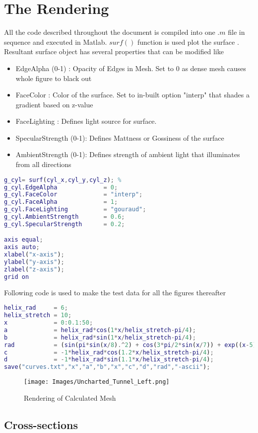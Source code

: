 \documentclass[a4paper]{article}
\begin{document}
\newpage
\hypertarget{the-rendering}{%
\section{ The Rendering}\label{the-rendering}}
All the code described throughout the document is compiled into one \(.m\) file in sequence and executed in Matlab. \(surf()\) function is used plot the surface \cite{mathworks_surf}. Resultant surface object has several properties that can be modified like \cite{mathworks_surface_properties}
\begin{itemize}
    \item EdgeAlpha (0-1) : Opacity of Edges in Mesh. Set to 0 as dense mesh causes whole figure to black out
    \item FaceColor : Color of the surface. Set to in-built option "interp" that shades a gradient based on z-value
    \item FaceLighting : Defines light source for surface.
    \item SpecularStrength (0-1): Defines Mattness or Gossiness of the surface
    \item AmbientStrength (0-1): Defines strength of ambient light that illuminates from all directions
\end{itemize}
\begin{lstlisting}[language=matlab]
g_cyl= surf(cyl_x,cyl_y,cyl_z); % 
g_cyl.EdgeAlpha             = 0;
g_cyl.FaceColor             = "interp";
g_cyl.FaceAlpha             = 1;
g_cyl.FaceLighting          = "gouraud";
g_cyl.AmbientStrength       = 0.6;
g_cyl.SpecularStrength      = 0.2;

axis equal;
axis auto;
xlabel("x-axis");
ylabel("y-axis");
zlabel("z-axis");
grid on
\end{lstlisting}

Following code is used to make the test data for all the figures thereafter
\begin{lstlisting}[language=matlab]
helix_rad     = 6;
helix_stretch = 10;
x             = 0:0.1:50;
a             = helix_rad*cos(1*x/helix_stretch-pi/4);
b             = helix_rad*sin(1*x/helix_stretch-pi/4);
rad           = (sin(pi*sin(x/8).^2) + cos(3*pi/2*sin(x/7)) + exp((x-5)/35)) + 1;
c             = -1*helix_rad*cos(1.2*x/helix_stretch-pi/4);
d             = -1*helix_rad*sin(1.1*x/helix_stretch-pi/4);
save("curves.txt","x","a","b","x","c","d","rad","-ascii");

\end{lstlisting}

\begin{figure}[h]
    \centering
    \texttt{[image: Images/Uncharted\_Tunnel\_Left.png]}
    \caption{Rendering of Calculated Mesh}
    \label{Channel with cross-sections}
\end{figure}
\hypertarget{the-plot}{%
\subsection{Cross-sections}\label{the-plot}}
\end{document}
